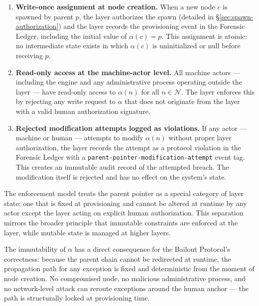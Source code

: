 \begin{enumerate}
\item[$\mathbf{F_1}$] \textbf{Write-once assignment at node creation.} When a new node $c$ is spawned by parent $p$, the \purpose{} layer authorizes the spawn (detailed in \S\ref{sec:spawn-authorization}) and the \fact{} layer records the provisioning event in the Forensic Ledger, including the initial value of $\alpha(c) = p$. This assignment is atomic: no intermediate state exists in which $\alpha(c)$ is uninitialized or null before receiving $p$.

\item[$\mathbf{F_2}$] \textbf{Read-only access at the machine-actor level.} All machine actors — including the \bounds{} engine and any administrative process operating outside the \purpose{} layer — have read-only access to $\alpha(n)$ for all $n \in \mathcal{N}$. The \fact{} layer enforces this by rejecting any write request to $\alpha$ that does not originate from the \purpose{} layer with a valid human authorization signature.

\item[$\mathbf{F_3}$] \textbf{Rejected modification attempts logged as violations.} If any actor — machine or human — attempts to modify $\alpha(n)$ without proper \purpose{} layer authorization, the \fact{} layer records the attempt as a protocol violation in the Forensic Ledger with a \texttt{parent-pointer-modification-attempt} event tag. This creates an immutable audit record of the attempted breach. The modification itself is rejected and has no effect on the system's state.
\end{enumerate}

The enforcement model treats the parent pointer as a special category of \fact{} layer state: one that is fixed at provisioning and cannot be altered at runtime by any actor except the \purpose{} layer acting on explicit human authorization. This separation mirrors the broader \bxthree{} principle that immutable constraints are enforced at the \fact{} layer, while mutable state is managed at higher layers.

The immutability of $\alpha$ has a direct consequence for the Bailout Protocol's correctness: because the parent chain cannot be redirected at runtime, the propagation path for any exception is fixed and deterministic from the moment of node creation. No compromised node, no malicious administrative process, and no network-level attack can reroute exceptions around the human anchor — the path is structurally locked at provisioning time.

